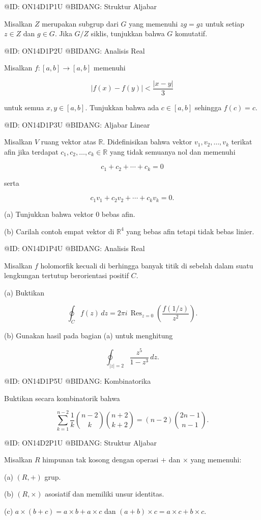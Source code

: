 @ID: ON14D1P1U
@BIDANG: Struktur Aljabar

Misalkan $Z$ merupakan subgrup dari $G$ yang memenuhi $zg=gz$ untuk setiap $z\in Z$ dan $g\in G$. Jika $G/Z$ siklis, tunjukkan bahwa $G$ komutatif.

@ID: ON14D1P2U
@BIDANG: Analisis Real

Misalkan $f:[a,b]\to[a,b]$ memenuhi

$$
|f(x)-f(y)|<\frac{|x-y|}{3}
$$

untuk semua $x,y\in[a,b]$. Tunjukkan bahwa ada $c\in[a,b]$ sehingga $f(c)=c$.

@ID: ON14D1P3U
@BIDANG: Aljabar Linear

Misalkan $V$ ruang vektor atas $\mathbb R$. Didefinisikan bahwa vektor $v_1,v_2,\ldots,v_k$ terikat afin jika terdapat $c_1,c_2,\ldots,c_k\in\mathbb R$ yang tidak semuanya nol dan memenuhi

$$
c_1+c_2+\cdots+c_k=0
$$

serta

$$
c_1v_1+c_2v_2+\cdots+c_kv_k=0.
$$

(a) Tunjukkan bahwa vektor $0$ bebas afin.

(b) Carilah contoh empat vektor di $\mathbb R^4$ yang bebas afin tetapi tidak bebas linier.

@ID: ON14D1P4U
@BIDANG: Analisis Real

Misalkan $f$ holomorfik kecuali di berhingga banyak titik di sebelah dalam suatu lengkungan tertutup berorientasi positif $C$.

(a) Buktikan

$$
\oint_C f(z)\,dz
=
2\pi i\,
\operatorname{Res}_{z=0}
\left(
\frac{f(1/z)}{z^2}
\right).
$$

(b) Gunakan hasil pada bagian (a) untuk menghitung

$$
\oint_{|z|=2}\frac{z^5}{1-z^3}\,dz.
$$

@ID: ON14D1P5U
@BIDANG: Kombinatorika

Buktikan secara kombinatorik bahwa

$$
\sum_{k=1}^{n-2}
\frac1k
\binom{n-2}{k}
\binom{n+2}{k+2}
=
(n-2)\binom{2n-1}{n-1}.
$$

@ID: ON14D2P1U
@BIDANG: Struktur Aljabar

Misalkan $R$ himpunan tak kosong dengan operasi $+$ dan $\times$ yang memenuhi:

(a) $(R,+)$ grup.

(b) $(R,\times)$ asosiatif dan memiliki unsur identitas.

(c) $a\times(b+c)=a\times b+a\times c$ dan $(a+b)\times c=a\times c+b\times c$.

